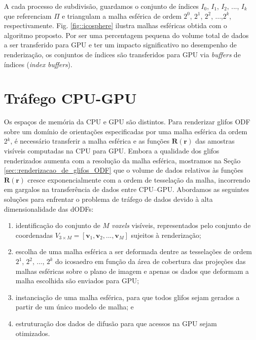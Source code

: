 A cada processo de subdivisão, guardamos o conjunto de índices $I_0$, $I_1$, $I_2$, ..., $I_k$ que referenciam $\Pi$ e triangulam a malha esférica de ordem $2^0$, $2^1$, $2^2$, ...,$2^k$, respectivamente. Fig. \ref{fig::icosphere} ilustra malhas esféricas obtida com o algoritmo proposto. Por ser uma percentagem pequena do volume total de dados a ser transferido para GPU e ter um impacto significativo no desempenho de renderização, os conjuntos de índices são transferidos para GPU via \textit{buffers} de índices (\textit{index buffers}).
\section{Tráfego CPU-GPU}
\label{sec::trafego_cpu_gpu}

Os espaços de memória da CPU e GPU são distintos. Para renderizar glifos ODF sobre um domínio de orientações especificadas por uma malha esférica da ordem 2$^k$, é necessário transferir a malha esférica e as funções  $\mathbf{R}(\mathbf{r})$ das amostras visíveis computadas na CPU para GPU. Embora a qualidade dos glifos renderizados aumenta com a resolução da malha esférica, mostramos na Seção \ref{sec::renderizacao_de_glifos_ODF} que o volume de dados relativos às funções $\mathbf{R}(\mathbf{r})$ cresce exponencialmente com a ordem de tesselação da malha, incorrendo em gargalos na transferência de dados entre CPU--GPU. Abordamos as seguintes soluções para enfrentar o problema de tráfego de dados devido à alta dimensionalidade das dODFs:

\begin{enumerate}
    \item identificação do conjunto de $M$ \textit{voxels} visíveis, representados pelo conjunto de coordenadas $V_{3 \times M} = [
\mathbf{v}_1,
\mathbf{v}_2, ..., 
\mathbf{v}_M
]$ sujeitos à renderização;
\item escolha de uma malha esférica a ser deformada dentre as tesselações de ordem $2^1$, $2^2$, ..., $2^k$ do icosaedro em função da área de cobertura das projeções das malhas esféricas sobre o plano de imagem e apenas os dados que deformam a malha escolhida são enviados para GPU;
\item instanciação de uma malha esférica, para que todos glifos sejam gerados a partir de um único modelo de malha; e
\item estruturação dos dados de difusão para que acessos na GPU sejam otimizados.
\end{enumerate}

